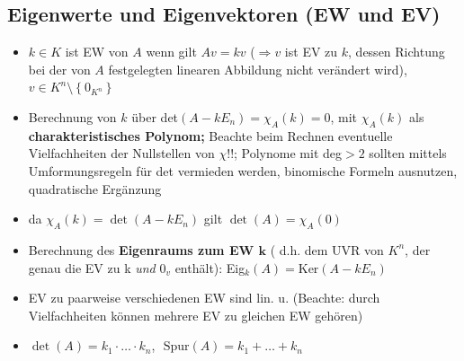 \documentclass[10pt,a4paper]{article}
\begin{document}
\subsection{Eigenwerte und Eigenvektoren (EW und EV)}
\begin{itemize}
\item $k\in K$ ist EW von $A$ wenn gilt $Av=kv$ ($\Rightarrow v$ ist EV zu $k$, dessen Richtung bei der von $A$ festgelegten linearen Abbildung nicht verändert wird), $v\in K^{n}\setminus \left\lbrace 0_{K^{n}}\right\rbrace$
\item Berechnung von $k$ über det$(A-kE_{n})=\chi_{A}(k)=0$, mit $\chi_{A}(k)$ als \textbf{charakteristisches Polynom;} Beachte beim Rechnen eventuelle Vielfachheiten der Nullstellen von $\chi$!!; Polynome mit deg$>2$ sollten mittels  Umformungsregeln für det vermieden werden, binomische Formeln ausnutzen, quadratische Ergänzung
\item da $\chi_{A}(k)=\det (A-kE_{n})$ gilt $\det(A)=\chi_{A}(0)$
\item Berechnung des \textbf{Eigenraums zum EW $\boldsymbol{k}$} ( d.h. dem UVR von $K^{n}$, der genau die EV zu k \textit{und} $0_{v}$ enthält): Eig$_{k}(A)=\text{Ker}(A-kE_{n})$
\item EV zu paarweise verschiedenen EW sind lin. u. (Beachte: durch Vielfachheiten können mehrere EV zu gleichen EW gehören)
\item $\det(A)=k_{1}\cdot \dotsc \cdot k_{n}$, $\text{ Spur}(A)=k_{1}+\dotsc +k_{n}$
\end{itemize}
\end{document}
